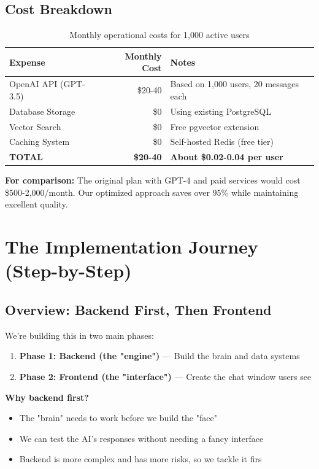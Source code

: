\documentclass[12pt,a4paper]{article}
\begin{document}
\subsection{Cost Breakdown}

\begin{table}[h]
\centering
\begin{tabular}{|l|r|l|}
\hline
\textbf{Expense} & \textbf{Monthly Cost} & \textbf{Notes} \\
\hline
OpenAI API (GPT-3.5) & \$20-40 & Based on 1,000 users, 20 messages each \\
Database Storage & \$0 & Using existing PostgreSQL \\
Vector Search & \$0 & Free pgvector extension \\
Caching System & \$0 & Self-hosted Redis (free tier) \\
\hline
\textbf{TOTAL} & \textbf{\$20-40} & \textbf{About \$0.02-0.04 per user} \\
\hline
\end{tabular}
\caption{Monthly operational costs for 1,000 active users}
\end{table}

\begin{keypoint}
\textbf{For comparison:} The original plan with GPT-4 and paid services would cost \$500-2,000/month. Our optimized approach saves over 95\% while maintaining excellent quality.
\end{keypoint}

\section{The Implementation Journey (Step-by-Step)}

\subsection{Overview: Backend First, Then Frontend}

We're building this in two main phases:
\begin{enumerate}
  \item \textbf{Phase 1: Backend (the "engine")} — Build the brain and data systems
  \item \textbf{Phase 2: Frontend (the "interface")} — Create the chat window users see
\end{enumerate}

\textbf{Why backend first?}
\begin{itemize}
  \item The "brain" needs to work before we build the "face"
  \item We can test the AI's responses without needing a fancy interface
  \item Backend is more complex and has more risks, so we tackle it firs
\end{itemize}
\end{document}
